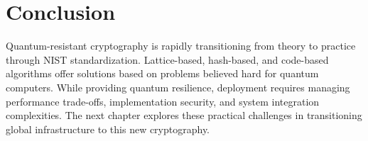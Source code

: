 \section{Conclusion}

Quantum-resistant cryptography is rapidly transitioning from theory to practice through NIST standardization. Lattice-based, hash-based, and code-based algorithms offer solutions based on problems believed hard for quantum computers. While providing quantum resilience, deployment requires managing performance trade-offs, implementation security, and system integration complexities. The next chapter explores these practical challenges in transitioning global infrastructure to this new cryptography.